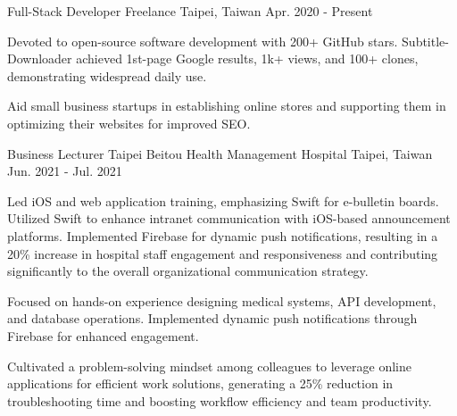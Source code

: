 

\begin{cventries}

  \cventry
    {Full-Stack Developer} %
    {Freelance} %
    {Taipei, Taiwan} %
    {Apr. 2020 - Present} %
    {
      \begin{cvitems} %
        \item {Devoted to open-source software development with 200+ GitHub stars. Subtitle-Downloader achieved 1st-page Google results, 1k+ views, and 100+ clones, demonstrating widespread daily use.}
        \item {Aid small business startups in establishing online stores and supporting them in optimizing their websites for improved SEO.}
      \end{cvitems}
    }

  \cventry
  {Business Lecturer} %
  {Taipei Beitou Health Management Hospital} %
  {Taipei, Taiwan} %
  {Jun. 2021 - Jul. 2021} %
  {
    \begin{cvitems} %
      \item {Led iOS and web application training, emphasizing Swift for e-bulletin boards. Utilized Swift to enhance intranet communication with iOS-based announcement platforms. Implemented Firebase for dynamic push notifications, resulting in a 20\% increase in hospital staff engagement and responsiveness and contributing significantly to the overall organizational communication strategy.}
      \item {Focused on hands-on experience designing medical systems, API development, and database operations. Implemented dynamic push notifications through Firebase for enhanced engagement.}
      \item {Cultivated a problem-solving mindset among colleagues to leverage online applications for efficient work solutions, generating a 25\% reduction in troubleshooting time and boosting workflow efficiency and team productivity.}
    \end{cvitems}
  }


\end{cventries}
